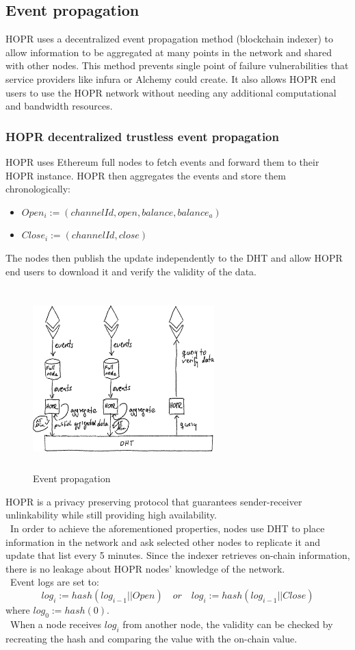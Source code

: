 \subsection{Event propagation}
HOPR uses a decentralized event propagation method (blockchain indexer) to allow information to be aggregated at many points in the network and shared with other nodes. 
This method prevents single point of failure vulnerabilities that service providers like infura or Alchemy could create. 
It also allows HOPR end users to use the HOPR network without needing any additional computational and bandwidth resources.  
\subsubsection*{HOPR decentralized trustless event propagation} 
HOPR uses Ethereum full nodes to fetch events and forward them to their HOPR instance. 
HOPR then aggregates the events and store them chronologically:
\begin{itemize}
    \item $Open_i:=(channelId, open, balance, balance_a)$
    \item $Close_i:=(channelId, close)$
\end{itemize}
The nodes then publish the update independently to the DHT and allow HOPR end users to download it and verify the validity of the data.
\begin{figure}[H]
    \centering
    \includegraphics[width=7cm,height=7cm,keepaspectratio]{../whitepaper/images/event_propagation.png}
    \caption{Event propagation}
    \label{fig:Event propagation}
\end{figure}
\hspace{-5mm}HOPR is a privacy preserving protocol that guarantees sender-receiver unlinkability while still providing high availability.
\\~In order to achieve the aforementioned properties, nodes use DHT to place information in the network and ask selected other nodes to replicate it and update that list every 5 minutes. Since the indexer retrieves on-chain information, there is no leakage about HOPR nodes' knowledge of the network.
\\~Event logs are set to: $$log_i:=hash( log_{i-1}|| Open) \quad or \quad log_i:=hash( log_{i-1}|| Close )$$ where $log_0:=hash(0)$.
\\~When a node receives $log_i$ from another node, the validity can be checked by recreating the hash and comparing the value with the on-chain value.






